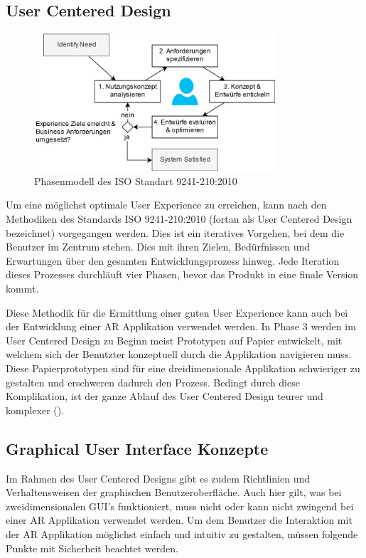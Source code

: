 \documentclass[a4paper]{scrreprt}
\begin{document}
\subsection{User Centered Design}
\begin{figure}[h!]
	\centering
	\includegraphics[keepaspectratio,width=0.8\textwidth]{UserCenteredDesign}
	\caption{Phasenmodell des ISO Standart 9241-210:2010 \parencite{ISO9241}}
\end{figure}

Um eine möglichst optimale User Experience zu erreichen, kann nach den Methodiken des Standards ISO 9241-210:2010 (fortan als User Centered Design bezeichnet) vorgegangen werden. Dies ist ein iteratives Vorgehen, bei dem die Benutzer im Zentrum stehen. Dies mit ihren Zielen, Bedürfnissen und Erwartungen über den gesamten Entwicklungsprozess hinweg. 
Jede Iteration dieses Prozesses durchläuft vier Phasen, bevor das Produkt in eine finale Version kommt.

Diese Methodik für die Ermittlung einer guten User Experience kann auch bei der Entwicklung einer AR Applikation verwendet werden.
In Phase 3 werden im User Centered Design zu Beginn meist Prototypen auf Papier entwickelt, mit welchem sich der Benutzter konzeptuell durch die Applikation navigieren muss. Diese Papierprototypen sind für eine dreidimensionale Applikation schwieriger zu gestalten und erschweren dadurch den Prozess. Bedingt durch diese Komplikation, ist der ganze Ablauf des User Centered Design teurer und komplexer (\cite{ISO9241}).

\subsection{Graphical User Interface Konzepte}
Im Rahmen des User Centered Designs gibt es zudem Richtlinien und Verhaltensweisen der graphischen Benutzeroberfläche.
Auch hier gilt, was bei zweidimensionalen GUI's funktioniert, muss nicht oder kann nicht zwingend bei einer AR Applikation verwendet werden. Um dem Benutzer die Interaktion mit der AR Applikation möglichst einfach und intuitiv zu gestalten, müssen folgende Punkte mit Sicherheit beachtet werden.
\end{document}
